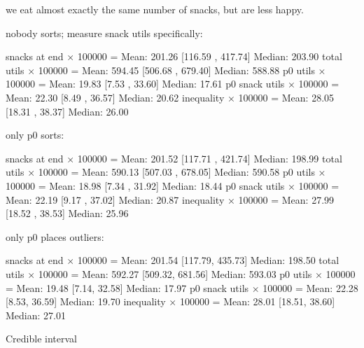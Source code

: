 \documentclass[twocolumn]{article}
\begin{document}
we eat almost exactly the same number of snacks, but are less happy.


nobody sorts; measure snack utils specifically:

snacks at end × 100000 = Mean: 201.26 [116.59 , 417.74] Median: 203.90
total utils × 100000 = Mean: 594.45 [506.68 , 679.40] Median: 588.88
p0 utils × 100000 = Mean: 19.83 [7.53 , 33.60] Median: 17.61
p0 snack utils × 100000 = Mean: 22.30 [8.49 , 36.57] Median: 20.62
inequality × 100000 = Mean: 28.05 [18.31 , 38.37] Median: 26.00

only p0 sorts:

snacks at end × 100000 = Mean: 201.52 [117.71 , 421.74] Median: 198.99
total utils × 100000 = Mean: 590.13 [507.03 , 678.05] Median: 590.58
p0 utils × 100000 = Mean: 18.98 [7.34 , 31.92] Median: 18.44
p0 snack utils × 100000 = Mean: 22.19 [9.17 , 37.02] Median: 20.87
inequality × 100000 = Mean: 27.99 [18.52 , 38.53] Median: 25.96

only p0 places outliers:

snacks at end × 100000 = Mean: 201.54 [117.79, 435.73] Median: 198.50
total utils × 100000 = Mean: 592.27 [509.32, 681.56] Median: 593.03
p0 utils × 100000 = Mean: 19.48 [7.14, 32.58] Median: 17.97
p0 snack utils × 100000 = Mean: 22.28 [8.53, 36.59] Median: 19.70
inequality × 100000 = Mean: 28.01 [18.51, 38.60] Median: 27.01



Credible interval\cite{kruschke2014doing}



\end{document}
